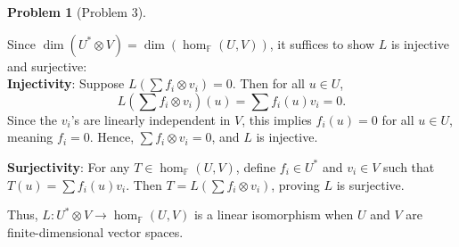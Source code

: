 \documentclass[12pt]{article}
\theoremstyle{definition}
\newtheorem{problem}{Problem}
\begin{document}
\begin{problem}[Problem 3]
\begin{solution}
        Since \( \dim(U^* \otimes V) = \dim(\hom_\mathbb{F}(U, V)) \), it suffices to show \( L \) is injective and surjective:\\
        \textbf{Injectivity}: Suppose \( L\left(\sum f_i \otimes v_i\right) = 0 \). Then for all \( u \in U \),
        \[
        L\left(\sum f_i \otimes v_i\right)(u) = \sum f_i(u) v_i = 0.
        \]
        Since the \( v_i \)'s are linearly independent in \( V \), this implies \( f_i(u) = 0 \) for all \( u \in U \), meaning \( f_i = 0 \). Hence, \( \sum f_i \otimes v_i = 0 \), and \( L \) is injective.

        \textbf{Surjectivity}: For any \( T \in \hom_\mathbb{F}(U, V) \), define \( f_i \in U^* \) and \( v_i \in V \) such that \( T(u) = \sum f_i(u) v_i \). Then \( T = L\left(\sum f_i \otimes v_i\right) \), proving \( L \) is surjective.

        Thus, \( L: U^* \otimes V \to \hom_\mathbb{F}(U, V) \) is a linear isomorphism when \( U \) and \( V \) are finite-dimensional vector spaces.

    \end{solution}
\end{problem}
\end{document}
